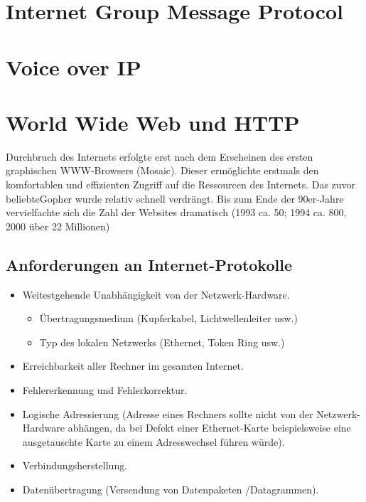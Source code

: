 \documentclass{article} %
\begin{document}
\section{Internet Group Message Protocol}

\section{Voice over IP}

\section{World Wide Web und HTTP}


Durchbruch des Internets erfolgte erst nach dem Erscheinen des ersten graphischen WWW-Browsers (\glqq Mosaic\grqq).
Dieser ermöglichte erstmals den komfortablen und effizienten Zugriff auf die Ressourcen des Internets.
Das zuvor \glqq beliebte\grqq{\ }Gopher wurde relativ schnell verdrängt.
Bis zum Ende der 90er-Jahre vervielfachte sich die Zahl der Websites dramatisch (1993 ca. 50; 1994 ca. 800, 2000 über 22 Millionen)

\subsection{Anforderungen an Internet-Protokolle}

\begin{itemize}
	\item Weitestgehende Unabhängigkeit von der Netzwerk-Hardware.
	\begin{itemize}
		\item Übertragungsmedium (Kupferkabel, Lichtwellenleiter usw.)
		\item Typ des lokalen Netzwerks (Ethernet, Token Ring usw.)
	\end{itemize}
	\item Erreichbarkeit aller Rechner im gesamten Internet.
	\item Fehlererkennung und Fehlerkorrektur.
	\item Logische Adressierung (Adresse eines Rechners sollte nicht von der Netzwerk-Hardware abhängen, da bei Defekt einer Ethernet-Karte beispielsweise eine ausgetauschte Karte zu einem Adresswechsel führen würde).
	\item Verbindungsherstellung.
	\item Datenübertragung (Versendung von Datenpaketen /Datagrammen).
\end{itemize}
\end{document}
